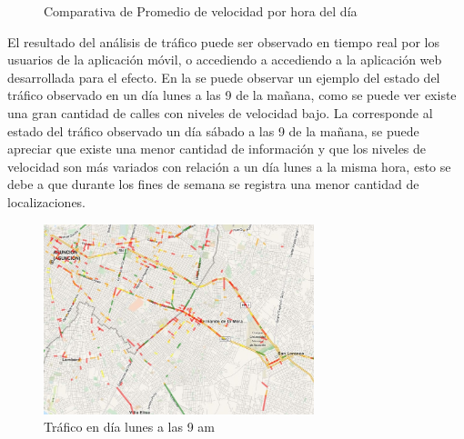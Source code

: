\begin{figure}[h]
\centering
{}
\caption{Comparativa de Promedio de velocidad por hora del día}
\label{fig:promedio_velocidad_es_fs}
\end{figure}

El resultado del análisis de tráfico puede ser observado en tiempo real por los usuarios de la aplicación móvil, o accediendo a accediendo a la aplicación web desarrollada para el efecto. En la  se puede observar un ejemplo del estado del tráfico observado en un día lunes a las 9 de la mañana, como se puede ver existe una gran cantidad de calles con niveles de velocidad bajo. La  corresponde al estado del tráfico observado un día sábado a las 9 de la mañana, se puede apreciar que existe una menor cantidad de información y que los niveles de velocidad son más variados con relación a un día lunes a la misma hora, esto se debe a que durante los fines de semana se registra una menor cantidad de localizaciones.

\begin{figure}[!ht]
	\centering
	\includegraphics[width=0.7\textwidth]{capitulos/7/figuras/figura6.jpg}
	\caption{\label{fig:trafico_lunes} Tráfico en día lunes a las 9 am}	
\end{figure}


